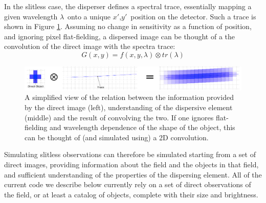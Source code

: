 \documentclass[preprint]{aastex}
\begin{document}
In the slitless case, the disperser defines a spectral trace, essentially mapping a given wavelength $\lambda$\ onto a unique $x'$,$y'$\ position on the detector. Such a trace is shown in Figure \ref{fig:1}. Assuming no change in sensitivity as a function of position, and ignoring pixel flat-fielding, a dispersed image can be thought of a the convolution of the direct image with the spectra trace:
\begin{dmath}
G(x,y) =  f(x,y,\lambda) \otimes tr(\lambda)
\end{dmath}

\begin{figure}[!ht]
\centering
\includegraphics[width=7.in]{"Figures/Grism_Equation"}
\caption{A simplified view of the relation between the information provided by the direct image (left), understanding of the dispersive element (middle) and the result of convolving the two. If one ignores flat-fielding and wavelength dependence of the shape of the object, this can be thought of (and simulated using) a 2D convolution.}
\label{fig:1}
\end{figure}

Simulating slitless observations can therefore be simulated starting from a set of direct images, providing information about the field and the objects in that field, and sufficient understanding of the properties of the dispersing element.
All of the current code we describe below currently rely on a set of direct observations of the field, or at least a catalog of objects, complete with their size and brightness. 
\end{document}
